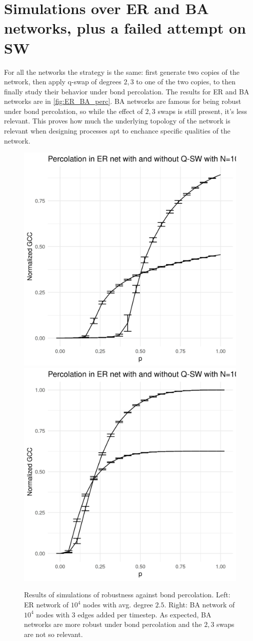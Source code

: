 \chapter{Simulations over ER and BA networks, plus a failed attempt on SW}


For all the networks the strategy is the same: first generate two copies of the network, then apply q-swap of degrees $2,3$ to one of the two copies, to then finally study their behavior under bond percolation. The results for ER and BA networks are in \autoref{fig:ER_BA_perc}. BA networks are famous for being robust under bond percolation, so while the effect of $2,3$ swaps is still present, it's less relevant. This proves how much the underlying topology of the network is relevant when designing processes apt to enchance specific qualities of the network.

\begin{figure}
    \centering
    \includegraphics[width=0.45\linewidth]{images/ER_perc_10000.png}
    \includegraphics[width=0.45\linewidth]{images/BA_perc_10000.png}
    \label{fig:ER_BA_perc}
    \caption{Results of simulations of robustness against bond percolation. Left: ER network of $10^4$ nodes with avg. degree $2.5$. Right: BA network of $10^4$ nodes with $3$ edges added per timestep. As expected, BA networks are more robust under bond percolation and the $2,3$ swaps are not so relevant.}
\end{figure}
 
